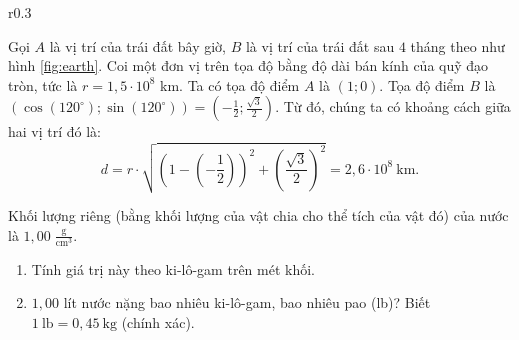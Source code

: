 \documentclass[a4paper, titlepage, openany]{book}
\newcounter{exercise}
\begin{document}
\begin{wrapfigure}{r}{0.3\textwidth}
   \centering
   \caption{Quỹ đạo trái đất}
   \label{fig:earth}
\end{wrapfigure}

Gọi $A$ là vị trí của trái đất bây giờ, $B$ là vị trí của trái đất sau $4$ tháng theo như hình \ref{fig:earth}. Coi một đơn vị trên tọa độ bằng độ dài bán kính của quỹ đạo tròn, tức là $r=1{,}5\cdot10^8$ km. Ta có tọa độ điểm $A$ là $(1;0)$. Tọa độ điểm $B$ là $\left(\cos(120^{\circ}); \sin(120^{\circ})\right)=\left(-\frac{1}{2}; \frac{\sqrt{3}}{2}\right)$. Từ đó, chúng ta có khoảng cách giữa hai vị trí đó là: $$d = r\cdot \sqrt{\left(1-\left(-\frac{1}{2}\right)\right)^2 + \left(\frac{\sqrt{3}}{2}\right)^2}=\boxed{2{,}6\cdot10^8\ \text{km}}.$$

\exercise Khối lượng riêng (bằng khối lượng của vật chia cho thể tích của vật đó) của nước là $1{,}00 \;\frac{\text{g}}{\text{cm}^3}$.
\begin{enumerate}
   \item Tính giá trị này theo ki-lô-gam trên mét khối.
   \item $1{,}00$ lít nước nặng bao nhiêu ki-lô-gam, bao nhiêu pao (lb)? Biết $1\ \text{lb} = 0{,}45\ \text{kg}$ (chính xác).
\end{enumerate}
\end{document}
